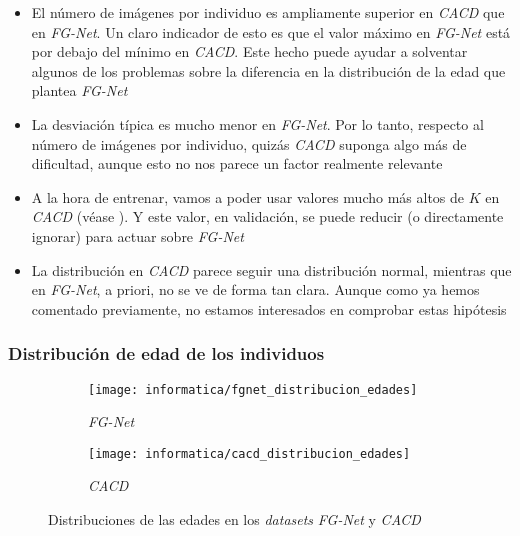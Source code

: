 \begin{itemize}
    \item El número de imágenes por individuo es ampliamente superior en \textit{CACD} que en \textit{FG-Net}. Un claro indicador de esto es que el valor máximo en \textit{FG-Net} está por debajo del mínimo en \textit{CACD}. Este hecho puede ayudar a solventar algunos de los problemas sobre la diferencia en la distribución de la edad que plantea \textit{FG-Net}
    \item La desviación típica es mucho menor en \textit{FG-Net}. Por lo tanto, respecto al número de imágenes por individuo, quizás \textit{CACD} suponga algo más de dificultad, aunque esto no nos parece un factor realmente relevante
    \item A la hora de entrenar, vamos a poder usar valores mucho más altos de $K$ en \textit{CACD} (véase ). Y este valor, en validación, se puede reducir (o directamente ignorar) para actuar sobre \textit{FG-Net}
    \item La distribución en \textit{CACD} parece seguir una distribución normal, mientras que en \textit{FG-Net}, a priori, no se ve de forma tan clara. Aunque como ya hemos comentado previamente, no estamos interesados en comprobar estas hipótesis
\end{itemize}

\subsubsection{Distribución de edad de los individuos} \label{isubsubs:conjunta_fgnet_cacd_edades}

\begin{figure}[H]
\centering
    \begin{subfigure}{.5\textwidth}
        \centering
        \texttt{[image: informatica/fgnet\_distribucion\_edades]}
        \caption{\textit{FG-Net}}
    \end{subfigure}%
    \begin{subfigure}{.5\textwidth}
        \centering
        \texttt{[image: informatica/cacd\_distribucion\_edades]}
        \caption{\textit{CACD}}
    \end{subfigure}
    \caption{Distribuciones de las edades en los \textit{datasets} \textit{FG-Net} y \textit{CACD}}
    \label{img:conjunta_fgnet_cacd_edades}
\end{figure}

